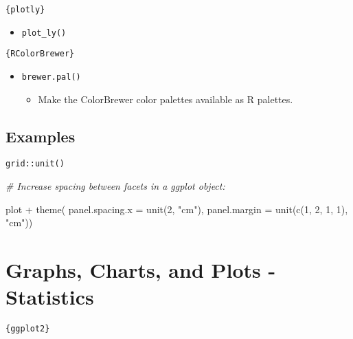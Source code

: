 \documentclass[
]{book}
\newenvironment{Shaded}{\begin{snugshade}}{\end{snugshade}}
\newcommand{\AttributeTok}[1]{\textcolor[rgb]{0.77,0.63,0.00}{#1}}
\newcommand{\CommentTok}[1]{\textcolor[rgb]{0.56,0.35,0.01}{\textit{#1}}}
\newcommand{\DecValTok}[1]{\textcolor[rgb]{0.00,0.00,0.81}{#1}}
\newcommand{\FunctionTok}[1]{\textcolor[rgb]{0.00,0.00,0.00}{#1}}
\newcommand{\NormalTok}[1]{#1}
\newcommand{\SpecialCharTok}[1]{\textcolor[rgb]{0.00,0.00,0.00}{#1}}
\newcommand{\StringTok}[1]{\textcolor[rgb]{0.31,0.60,0.02}{#1}}
\providecommand{\tightlist}{%
  \setlength{\itemsep}{0pt}\setlength{\parskip}{0pt}}
\begin{document}
\texttt{\{plotly\}}

\begin{itemize}
\tightlist
\item
  \texttt{plot\_ly()}
\end{itemize}

\texttt{\{RColorBrewer\}}

\begin{itemize}
\tightlist
\item
  \texttt{brewer.pal()}

  \begin{itemize}
  \tightlist
  \item
    Make the ColorBrewer color palettes available as R palettes.
  \end{itemize}
\end{itemize}

\hypertarget{examples-5}{%
\subsection{Examples}\label{examples-5}}

\texttt{grid::unit()}

\begin{Shaded}
\begin{Highlighting}[]
\CommentTok{\# Increase spacing between facets in a \textasciigrave{}ggplot\textasciigrave{} object:}

\NormalTok{plot }\SpecialCharTok{+} 
  \FunctionTok{theme}\NormalTok{(}
    \AttributeTok{panel.spacing.x =} \FunctionTok{unit}\NormalTok{(}\DecValTok{2}\NormalTok{, }\StringTok{"cm"}\NormalTok{),}
    \AttributeTok{panel.margin =} \FunctionTok{unit}\NormalTok{(}\FunctionTok{c}\NormalTok{(}\DecValTok{1}\NormalTok{, }\DecValTok{2}\NormalTok{, }\DecValTok{1}\NormalTok{, }\DecValTok{1}\NormalTok{), }\StringTok{"cm"}\NormalTok{))}
\end{Highlighting}
\end{Shaded}

\hypertarget{graphs-charts-and-plots---statistics}{%
\section{Graphs, Charts, and Plots - Statistics}\label{graphs-charts-and-plots---statistics}}

\texttt{\{ggplot2\}}
\end{document}
